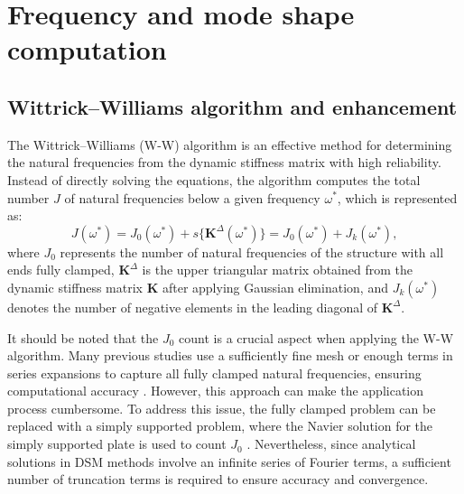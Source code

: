 \documentclass[preprint,12pt]{elsarticle}
\begin{document}
\section{Frequency and mode shape computation}\label{sec:WWA}
\subsection{Wittrick–Williams algorithm and enhancement}\label{sec:WWA2}
The Wittrick–Williams (W-W) algorithm \cite{wittrick1971general} is an effective method for determining the natural frequencies from the dynamic stiffness matrix with high reliability. 
Instead of directly solving the equations, the algorithm computes the total number $J$ of natural frequencies below a given frequency $\omega^*$, which is represented as:
\begin{equation}\label{eq:WWalgorithm}
	J(\omega^*) = J_0(\omega^*) + s\{\mathbf{K}^{\Delta}(\omega^*)\} = J_0(\omega^*) + J_k(\omega^*),
\end{equation}
where $J_0$ represents the number of natural frequencies of the structure with all ends fully clamped, $\mathbf{K}^{\Delta}$ is the upper triangular matrix obtained from the dynamic stiffness matrix $\mathbf{K}$ after applying Gaussian elimination, and $J_k(\omega^*)$ denotes the number of negative elements in the leading diagonal of $\mathbf{K}^{\Delta}$.

It should be noted that the $J_0$ count is a crucial aspect when applying the W-W algorithm. Many previous studies use a sufficiently fine mesh or enough terms in series expansions to capture all fully clamped natural frequencies, ensuring computational accuracy \cite{banerjee2015dynamic}. However, this approach can make the application process cumbersome. 
To address this issue, the fully clamped problem can be replaced with a simply supported problem, where the Navier solution for the simply supported plate is used to count $J_0$ \citep{liu2015exact}. 
Nevertheless, since analytical solutions in DSM methods involve an infinite series of Fourier terms, a sufficient number of truncation terms is required to ensure accuracy and convergence.   
\end{document}
